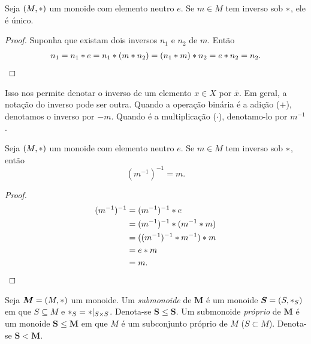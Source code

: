 \begin{prop}
\label{prop:unic.inv}
	Seja $(M, \ast )$ um monoide com elemento neutro $e$. Se $m \in M$ tem inverso sob $ \ast $, ele é único.
\end{prop}
\begin{proof}
	Suponha que existam dois inversos $n_1$ e $n_2$ de $m$. Então
	\begin{align*}
	n_1 = n_1 \ast e = n_1 \ast (m \ast n_2) = (n_1 \ast m) \ast n_2 = e \ast n_2 = n_2.
	\end{align*}
\end{proof}

\begin{nota}
	Isso nos permite denotar o inverso de um elemento $x \in X$ por $\overline x$. Em geral, a notação do inverso pode ser outra. Quando a operação binária é a adição ($+$), denotamos o inverso por $-m$. Quando é a multiplicação ($\cdot$), denotamo-lo por $m^{-1}$.
\end{nota}

\begin{prop}
	Seja $(M, \ast )$ um monoide com elemento neutro $e$. Se $m \in M$ tem inverso sob $ \ast $, então
	\begin{equation*}
	(m^{-1})^{-1}=m.
	\end{equation*}
\end{prop}
\begin{proof}
	\begin{equation*}
	\begin{split}
	(m^{-1})^{-1} &= (m^{-1})^{-1}  \ast  e \\
		&= (m^{-1})^{-1}  \ast  (m^{-1}  \ast  m) \\
		&= ((m^{-1})^{-1}  \ast  m^{-1})  \ast  m \\
		&= e  \ast  m \\
		&= m.
	\end{split}
	\end{equation*}
\end{proof}

\begin{defi}
Seja $\bm M=(M, \ast )$ um monoide. Um \emph{submonoide} de $\bm M$ é um monoide $\bm S=(S, \ast _S)$ em que $S \subseteq M$ e $ \ast _S= \ast |_{S \times S}$. Denota-se $\bm S \leq \bm S$. Um submonoide \emph{próprio} de $\bm M$ é um monoide $\bm S \leq \bm M$ em que $M$ é um subconjunto próprio de $M$ ($S \subset M$). Denota-se $\bm S < \bm M$.
\end{defi}

